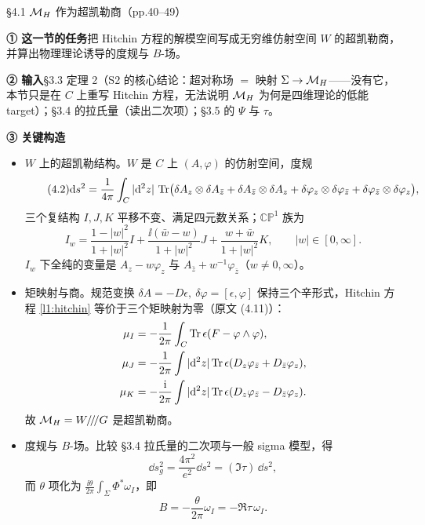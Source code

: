 \begin{kcard}{§4.1 $\mathcal{M}_H$ 作为超凯勒商（pp.40--49）}

\noindent\textbf{① 这一节的任务}\quad 把 Hitchin 方程的解模空间写成无穷维仿射空间 $W$ 的超凯勒商，并算出物理理论诱导的度规与 $B$-场。\pA{}

\noindent\textbf{② 输入}\quad \S3.3 定理 2（S2 的核心结论：超对称场 $=$ 映射 $\Sigma\to\mathcal{M}_H$——没有它，本节只是在 $C$ 上重写 Hitchin 方程，无法说明 $\mathcal{M}_H$ 为何是四维理论的低能 target）；\S3.4 的拉氏量（读出二次项）；\S3.5 的 $\Psi$ 与 $\tau$。

\noindent\textbf{③ 关键构造}\quad
\begin{itemize}
\item $W$ 上的超凯勒结构。$W$ 是 $C$ 上 $(A,\varphi)$ 的仿射空间，度规
\begin{equation}\label{l1:ds}\tag{4.2}
\mathrm{d} s^2=\frac{1}{4\pi}\int_C|\mathrm{d}^2z|\,\operatorname{Tr}\bigl(\delta A_z\otimes\delta A_{\bar z}+\delta A_{\bar z}\otimes\delta A_z+\delta\varphi_z\otimes\delta\varphi_{\bar z}+\delta\varphi_{\bar z}\otimes\delta\varphi_z\bigr),
\end{equation}
三个复结构 $I,J,K$ 平移不变、满足四元数关系；$\mathbb{CP}^1$ 族为
\begin{equation}\label{l1:iw}\tag{4.6}
I_w=\frac{1-|w|^2}{1+|w|^2}I+\frac{\ii(\bar w-w)}{1+|w|^2}J+\frac{w+\bar w}{1+|w|^2}K,\qquad |w|\in[0,\infty] .
\end{equation}
$I_w$ 下全纯的变量是 $A_z-w\varphi_z$ 与 $A_{\bar z}+w^{-1}\varphi_{\bar z}$（$w\ne0,\infty$）。\pA{}
\item 矩映射与商。规范变换 $\delta A=-D\epsilon,\ \delta\varphi=[\epsilon,\varphi]$ 保持三个辛形式，Hitchin 方程 \eqref{l1:hitchin} 等价于三个矩映射为零（原文 (4.11)）：
\[
\begin{aligned}
\mu_I&=-\frac{1}{2\pi}\int_C\operatorname{Tr}\epsilon(F-\varphi\wedge\varphi),\\
\mu_J&=-\frac{1}{2\pi}\int|\mathrm{d}^2z|\operatorname{Tr}\epsilon(D_z\varphi_{\bar z}+D_{\bar z}\varphi_z),\\
\mu_K&=-\frac{\mathrm{i}}{2\pi}\int|\mathrm{d}^2z|\operatorname{Tr}\epsilon(D_z\varphi_{\bar z}-D_{\bar z}\varphi_z).
\end{aligned}
\]
故 $\mathcal{M}_H=W/\!/\!/G$ 是超凯勒商。\pA{}
\item 度规与 $B$-场。比较 \S3.4 拉氏量的二次项与一般 sigma 模型，得
\[
\dd s^2_g=\frac{4\pi^2}{e^2}\dd s^2=(\Im\tau)\,\dd s^2 ,
\]
而 $\theta$ 项化为 $\frac{\ii\theta}{2\pi}\int_\Sigma\Phi^*\omega_I$，即
\begin{equation}\label{l1:bfield}\tag{4.19}
B=-\frac{\theta}{2\pi}\omega_I=-\Re\tau\,\omega_I .
\end{equation}
\pA{}
\end{itemize}


\end{kcard}
